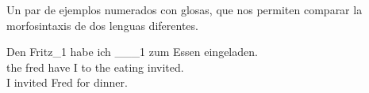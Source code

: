 \documentclass[a4paper]{article}
\begin{document}
Un par de ejemplos numerados con glosas, que nos permiten comparar la morfosintaxis de dos lenguas diferentes.

\begin{exe}
\ex
\gll Den Fritz_1 habe ich \_\_{}_1 zum Essen eingeladen.\\
the fred have I {} {to the} eating invited.\\
\glt I invited Fred for dinner.
\end{exe}

\begin{exe}\let\eachwordtwo=\sf
{}
\end{exe}




\end{document}
